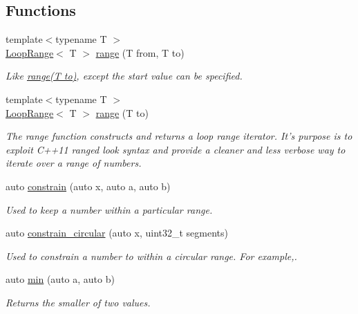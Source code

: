 \subsection*{Functions}
\begin{DoxyCompactItemize}
\item 
{\footnotesize template$<$typename T $>$ }\\\hyperlink{classetk_1_1_loop_range}{Loop\-Range}$<$ T $>$ \hyperlink{namespaceetk_aff39b0f367ee4d947e2e7d297ffd506b}{range} (T from, T to)
\begin{DoxyCompactList}\small\item\em Like \hyperlink{namespaceetk_a65f1ea4495206c62f285e48ffd2f677e}{range(\-T to)}, except the start value can be specified. \end{DoxyCompactList}\item 
{\footnotesize template$<$typename T $>$ }\\\hyperlink{classetk_1_1_loop_range}{Loop\-Range}$<$ T $>$ \hyperlink{namespaceetk_a65f1ea4495206c62f285e48ffd2f677e}{range} (T to)
\begin{DoxyCompactList}\small\item\em The range function constructs and returns a loop range iterator. It's purpose is to exploit C++11 ranged look syntax and provide a cleaner and less verbose way to iterate over a range of numbers. \end{DoxyCompactList}\item 
auto \hyperlink{namespaceetk_a3b8ba4e0ed638ad07a7ab4f6cfc22c26}{constrain} (auto x, auto a, auto b)
\begin{DoxyCompactList}\small\item\em Used to keep a number within a particular range. \end{DoxyCompactList}\item 
auto \hyperlink{namespaceetk_a0bb96bed2b97ddb4eba560684c0e050a}{constrain\-\_\-circular} (auto x, uint32\-\_\-t segments)
\begin{DoxyCompactList}\small\item\em Used to constrain a number to within a circular range. For example,. \end{DoxyCompactList}\item 
auto \hyperlink{namespaceetk_a6643ab662d2d880d937a8adfea183ac6}{min} (auto a, auto b)
\begin{DoxyCompactList}\small\item\em Returns the smaller of two values. \end{DoxyCompactList}\item 

\end{DoxyCompactItemize}
